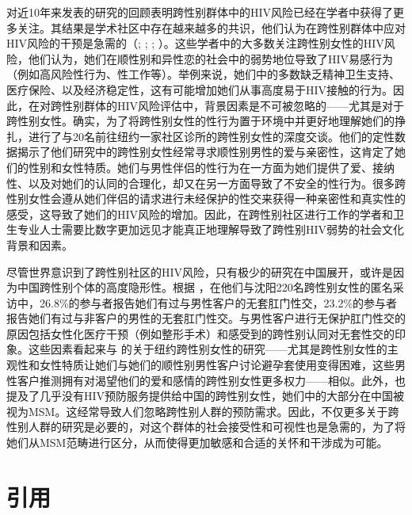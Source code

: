 \documentclass[5p]{elsarticle}
\begin{document}
对近10年来发表的研究的回顾表明跨性别群体中的HIV风险已经在学者中获得了更多关注。其结果是学术社区中存在越来越多的共识，他们认为在跨性别群体中应对HIV风险的干预是急需的（\cite{baral2013}; \cite{desantis2009}; \cite{herbst2008}; \cite{nuttbrock2009}）。这些学者中的大多数关注跨性别女性的HIV风险，他们认为，她们在顺性别和异性恋的社会中的弱势地位导致了HIV易感行为（例如高风险性行为、性工作等）。举例来说，她们中的多数缺乏精神卫生支持、医疗保险、以及经济稳定性，这有可能增加她们从事高度易于HIV接触的行为。因此，在对跨性别群体的HIV风险评估中，背景因素是不可被忽略的------尤其是对于跨性别女性。确实，为了将跨性别女性的性行为置于环境中并更好地理解她们的挣扎，\cite{melendez2007}进行了与20名前往纽约一家社区诊所的跨性别女性的深度交谈。他们的定性数据揭示了他们研究中的跨性别女性经常寻求顺性别男性的爱与亲密性，这肯定了她们的性别和女性特质。她们与男性伴侣的性行为在一方面为她们提供了爱、接纳性、以及对她们的认同的合理化，却又在另一方面导致了不安全的性行为。很多跨性别女性会遵从她们伴侣的请求进行未经保护的性交来获得一种亲密性和真实性的感受，这导致了她们的HIV风险的增加。因此，在跨性别社区进行工作的学者和卫生专业人士需要比数字更加远见才能真正地理解导致了跨性别HIV弱势的社会文化背景和因素。

尽管世界意识到了跨性别社区的HIV风险，只有极少的研究在中国展开，或许是因为中国跨性别个体的高度隐形性。根据 \cite{cai2016}，在他们与沈阳220名跨性别女性的匿名采访中，26.8\%的参与者报告她们有过与男性客户的无套肛门性交，23.2\%的参与者报告她们有过与非客户的男性的无套肛门性交。与男性客户进行无保护肛门性交的原因包括女性化医疗干预（例如整形手术）和感受到的跨性别认同对无套性交的印象。这些因素看起来与 \cite{melendez2007}的关于纽约跨性别女性的研究------尤其是跨性别女性的主观性和女性特质让她们与她们的顺性别男性客户讨论避孕套使用变得困难，这些男性客户推测拥有对渴望他们的爱和感情的跨性别女性更多权力------相似。此外，\cite{cai2016}也提及了几乎没有HIV预防服务提供给中国的跨性别女性，她们中的大部分在中国被视为MSM。这经常导致人们忽略跨性别人群的预防需求。因此，不仅更多关于跨性别人群的研究是必要的，对这个群体的社会接受性和可视性也是急需的，为了将她们从MSM范畴进行区分，从而使得更加敏感和合适的关怀和干涉成为可能。

\section*{引用}

\end{document}
